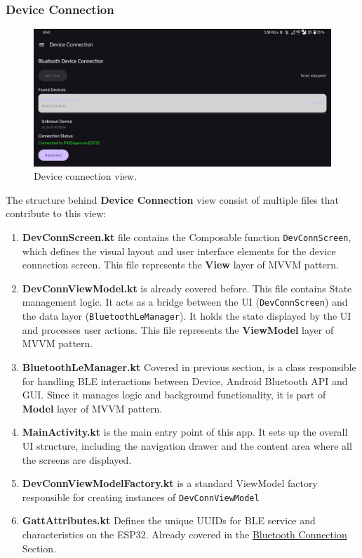 \subsubsection{Device Connection}
\begin{figure}[h!]
	\centering
	\includegraphics[width=0.8\linewidth]{Figures/devConnView}
	\caption[Device connection view.]{Device connection view.}
	\label{fig:devconnview}
\end{figure}
The structure behind \textbf{Device Connection} view consist of multiple files that contribute to this view:
\begin{enumerate}
	\item \textbf{DevConnScreen.kt} file contains the Composable function \texttt{DevConnScreen}, which defines the visual layout and user interface elements for the device connection screen. This file represents the \textbf{View} layer of \ac{MVVM} pattern.
	\item \textbf{DevConnViewModel.kt} is already covered before. This file contains State management logic. It acts as a bridge between the UI (\texttt{DevConnScreen}) and the data layer (\texttt{BluetoothLeManager}). It holds the state displayed by the UI and processes user actions. This file represents the \textbf{ViewModel} layer of \ac{MVVM} pattern.
	\item \textbf{BluetoothLeManager.kt} Covered in previous section, is a class responsible for handling \ac{BLE} interactions between Device, Android Bluetooth \ac{API} and \ac{GUI}. Since it manages logic and background functionality, it is part of \textbf{Model} layer of \ac{MVVM} pattern.
	\item \textbf{MainActivity.kt} is the main entry point of this app. It sets up the overall UI structure, including the navigation drawer and the content area where all the screens are displayed.
	\item \textbf{DevConnViewModelFactory.kt} is a standard ViewModel factory responsible for creating instances of \texttt{DevConnViewModel}
	\item \textbf{GattAttributes.kt} Defines the unique UUIDs for \ac{BLE} service and characteristics on the ESP32. Already covered in the \hyperref[subsec:Bluetooth]{Bluetooth Connection} Section.
\end{enumerate}
